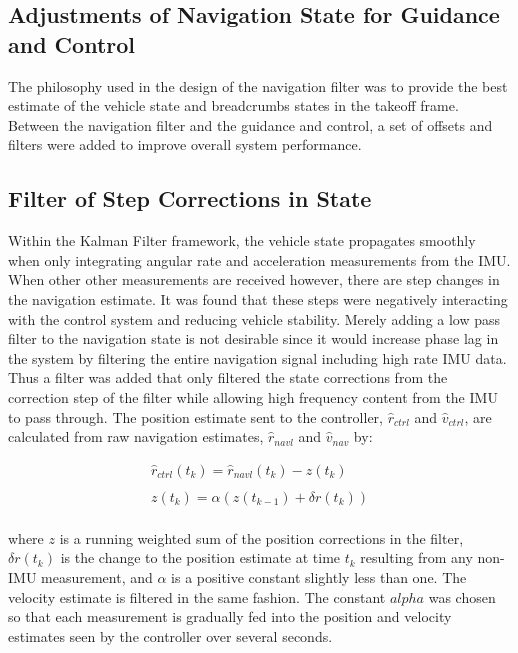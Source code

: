 \subsection{Adjustments of Navigation State for Guidance and Control}

The philosophy used in the design of the navigation filter was to provide the best estimate of the vehicle state and breadcrumbs states in the takeoff frame.  Between the navigation filter and the guidance and control, a set of offsets and filters were added to improve overall system performance.

\subsection{Filter of Step Corrections in State}

Within the Kalman Filter framework, the vehicle state propagates smoothly when only integrating angular rate and acceleration measurements from the IMU.  When other other measurements are received however, there are step changes in the navigation estimate.  It was found that these steps were negatively interacting with the control system and reducing vehicle stability.  Merely adding a low pass filter to the navigation state is not desirable since it would increase phase lag in the system by filtering the entire navigation signal including high rate IMU data.  Thus a filter was added that only filtered the state corrections from the correction step of the filter while allowing high frequency content from the IMU to pass through.  The position estimate sent to the controller, $\hat{r}_{ctrl}$ and $\hat{v}_{ctrl}$, are calculated from raw navigation estimates, $\hat{r}_{navl}$ and $\hat{v}_{nav}$ by:

\begin{equation}
    {\begin{array}{c}
   \hat{r}_{ctrl}(t_k) = \hat{r}_{navl}(t_k) - z(t_k) \\ \\
   z(t_k) = \alpha\left(z(t_{k-1}) + \delta r(t_k)\right) \\
   \end{array}}
\end{equation}

\noindent where $z$ is a running weighted sum of the position corrections in the filter, $\delta r(t_k)$ is the change to the position estimate at time $t_k$ resulting from any non-IMU measurement, and $\alpha$ is a positive constant slightly less than one.  The velocity estimate is filtered in the same fashion.  The constant $alpha$ was chosen so that each measurement is gradually fed into the position and velocity estimates seen by the controller over several seconds.


